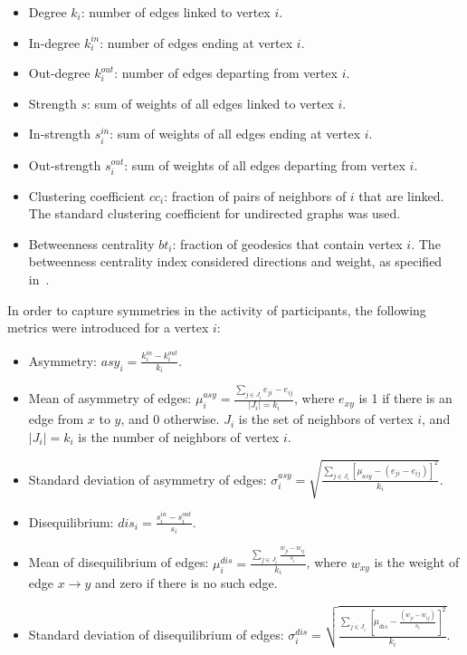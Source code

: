 \documentclass[%
	aip,
	jmp,%
	amsmath,amssymb,
	reprint,%
]{revtex4-1}
\begin{document}
\begin{itemize}
	\item Degree     $k_i$: number of edges linked to vertex $i$.
	\item In-degree  $k_i^{in}$: number of edges ending at vertex $i$.
	\item Out-degree $k_i^{out}$: number of edges departing from vertex $i$.
	\item Strength $s$: sum of weights of all edges linked to vertex $i$.
	\item In-strength $s_i^{in}$: sum of weights of all edges ending at vertex $i$.
	\item Out-strength $s_i^{out}$: sum of weights of all edges departing from vertex $i$.
	\item Clustering coefficient $cc_i$: fraction of pairs of neighbors of $i$ that are linked.  The standard clustering coefficient for undirected graphs was used.
	\item Betweenness centrality $bt_i$: fraction of geodesics that contain vertex $i$. The betweenness centrality index considered directions and weight, as specified in~\cite{faster}.
\end{itemize}

In order to capture symmetries in the activity of participants, the following metrics were introduced for a vertex $i$: 

\begin{itemize}
	\item Asymmetry: $asy_i=\frac{k_i^{in}-k_i^{out}}{k_i}$.
	\item Mean of asymmetry of edges: $\mu_i^{asy}=\frac{\sum_{j\in J_i} e_{ji}-e_{ij}}{|J_i|=k_i}$, where $e_{xy}$ is 1 if there is an edge from $x$ to $y$, and $0$ otherwise. $J_i$ is the set of neighbors of vertex $i$, and $|J_i|=k_i$ is the number of neighbors of vertex $i$.
	\item Standard deviation of asymmetry of edges: $\sigma_i^{asy}=\sqrt{\frac{\sum_{j\in J_i}[\mu_{asy} -(e_{ji}-e_{ij}) ]^2  }{k_i}  }$.
	\item Disequilibrium: $dis_i=\frac{s_i^{in}-s_i^{out}}{s_i}$.
	\item Mean of disequilibrium of edges: $\mu_i^{dis}=\frac{\sum_{j \in J_i}\frac{w_{ji}-w_{ij}}{s_i}}{k_i}$, where $w_{xy}$ is the weight of edge $x\rightarrow y$ and zero if there is no such edge.
	\item Standard deviation of disequilibrium of edges: $\sigma_i^{dis}=\sqrt{\frac{\sum_{j\in J_i}[\mu_{dis}-\frac{(w_{ji}-w_{ij})}{s_i}]^2}{k_i}}$.
\end{itemize}
\end{document}
